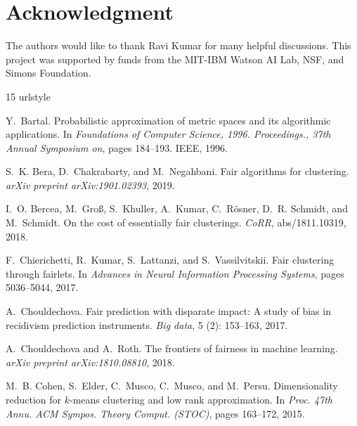 \documentclass[11pt]{article}
\begin{document}
\section*{Acknowledgment}
The authors would like to thank Ravi Kumar for many helpful discussions. This project was supported by funds from the MIT-IBM Watson AI Lab, NSF, and Simons Foundation. 
%
%
\begin{thebibliography}{15}
\providecommand{\natexlab}[1]{#1}
\providecommand{\url}[1]{\texttt{#1}}
\expandafter\ifx\csname urlstyle\endcsname\relax
  \providecommand{\doi}[1]{doi: #1}\else
  \providecommand{\doi}{doi: \begingroup \urlstyle{rm}\Url}\fi

Y.~Bartal.
\newblock Probabilistic approximation of metric spaces and its algorithmic
  applications.
\newblock In \emph{Foundations of Computer Science, 1996. Proceedings., 37th
  Annual Symposium on}, pages 184--193. IEEE, 1996.

S.~K. Bera, D.~Chakrabarty, and M.~Negahbani.
\newblock Fair algorithms for clustering.
\newblock \emph{arXiv preprint arXiv:1901.02393}, 2019.

I.~O. Bercea, M.~Gro{\ss}, S.~Khuller, A.~Kumar, C.~R{\"{o}}sner, D.~R.
  Schmidt, and M.~Schmidt.
\newblock On the cost of essentially fair clusterings.
\newblock \emph{CoRR}, abs/1811.10319, 2018.

F.~Chierichetti, R.~Kumar, S.~Lattanzi, and S.~Vassilvitskii.
\newblock Fair clustering through fairlets.
\newblock In \emph{Advances in Neural Information Processing Systems}, pages
  5036--5044, 2017.

A.~Chouldechova.
\newblock Fair prediction with disparate impact: A study of bias in recidivism
  prediction instruments.
\newblock \emph{Big data}, 5 (2): 153--163, 2017.

A.~Chouldechova and A.~Roth.
\newblock The frontiers of fairness in machine learning.
\newblock \emph{arXiv preprint arXiv:1810.08810}, 2018.

M.~B. Cohen, S.~Elder, C.~Musco, C.~Musco, and M.~Persu.
\newblock Dimensionality reduction for {$k$}-means clustering and low rank
  approximation.
\newblock In \emph{Proc. 47th Annu. ACM Sympos. Theory Comput. {\em(STOC)}},
  pages 163--172, 2015.


\end{thebibliography}
\end{document}
